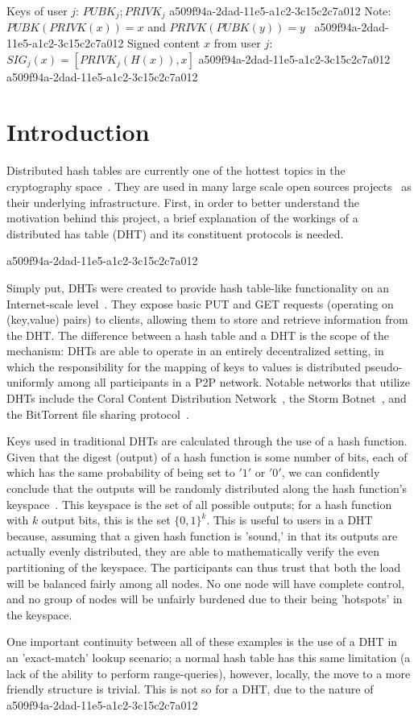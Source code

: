 \documentclass[12pt]{article}
\begin{document}
Keys of user $j$: $ PUBK_j; PRIVK_j $
a509f94a-2dad-11e5-a1c2-3c15c2c7a012
Note: $PUBK(PRIVK(x)) = x$ and $PRIVK(PUBK(y)) = y$~
a509f94a-2dad-11e5-a1c2-3c15c2c7a012
Signed content $x$ from user $j$: $SIG_j(x) = \left[ PRIVK_j( H(x) ), x \right]$
a509f94a-2dad-11e5-a1c2-3c15c2c7a012
a509f94a-2dad-11e5-a1c2-3c15c2c7a012\section{Introduction}
\par Distributed hash tables are currently one of the hottest topics in the cryptography space~\cite{Stoica:2001dj,Rowstron:2001ea,Ratnasamy:2001wn}. They are used in many large scale open sources projects~\cite{Freitas:2013tb,Xu:2010vs,Perfitt:2010fh} as their underlying infrastructure. First, in order to better understand the motivation behind this project, a brief explanation of the workings of a distributed has table (DHT) and its constituent protocols is needed.

a509f94a-2dad-11e5-a1c2-3c15c2c7a012\par Simply put, DHTs were created to provide hash table-like functionality on an Internet-scale level~\cite{Ratnasamy:2001wn}. They expose basic PUT and GET requests (operating on (key,value) pairs) to clients, allowing them to store and retrieve information from the DHT. The difference between a hash table and a DHT is the scope of the mechanism: DHTs are able to operate in an entirely decentralized setting, in which the responsibility for the mapping of keys to values is distributed pseudo-uniformly among all participants in a P2P network. Notable networks that utilize DHTs include the Coral Content Distribution Network~\cite{Freedman:2004vb}, the Storm Botnet~\cite{Holz:2008uk}, and the BitTorrent file sharing protocol~\cite{Cohen:y1_8mBnw}.

\par Keys used in traditional DHTs are calculated through the use of a hash function. Given that the digest (output) of a hash function is some number of bits, each of which has the same probability of being set to $'1'$ or $'0'$, we can confidently conclude that the outputs will be randomly distributed along the hash function's keyspace~. This keyspace is the set of all possible outputs; for a hash function with $k$ output bits, this is the set $\{0,1\}^k$. This is useful to users in a DHT because, assuming that a given hash function is 'sound,' in that its outputs are actually evenly distributed, they are able to mathematically verify the even partitioning of the keyspace. The participants can thus trust that both the load will be balanced fairly among all nodes. No one node will have complete control, and no group of nodes will be unfairly burdened due to their being 'hotspots' in the keyspace.~

\par One important continuity between all of these examples is the use of a DHT in an 'exact-match' lookup scenario; a normal hash table has this same limitation (a lack of the ability to perform range-queries), however, locally, the move to a more friendly structure is trivial. This is not so for a DHT, due to the nature of
\printbibliography
a509f94a-2dad-11e5-a1c2-3c15c2c7a012
\end{document}
